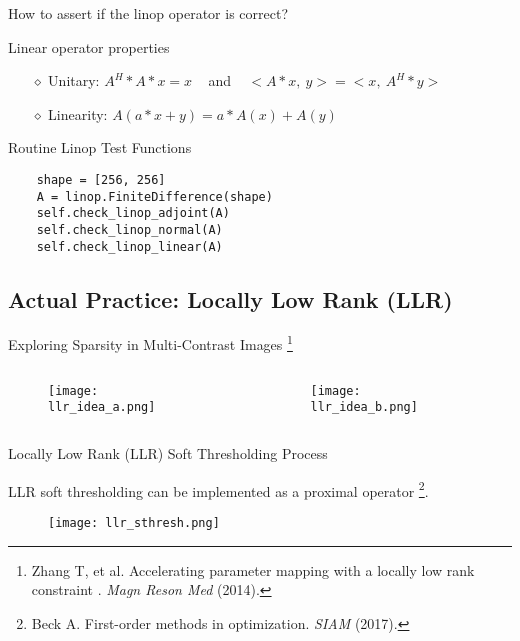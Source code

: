 \begin{frame}[fragile]{How to assert if the linop operator is correct?}

\begin{block}{Linear operator properties}
	{\large
	\begin{itemize}
		\item [$\diamond$] Unitary: $A^H * A * x = x \;\;\;$ and $\;\;\; <A*x,~y> = <x,~A^H*y>$
		\item [$\diamond$] Linearity: $A(a * x + y) = a * A(x) + A(y)$
	\end{itemize}}
\end{block}

\begin{block}{Routine Linop Test Functions}
\begin{lstlisting}
    shape = [256, 256]
    A = linop.FiniteDifference(shape)
    self.check_linop_adjoint(A)
    self.check_linop_normal(A)
    self.check_linop_linear(A)
\end{lstlisting}
\end{block}

\end{frame}

\subsection{Actual Practice: Locally Low Rank (LLR)}

\begin{frame}{Exploring Sparsity in Multi-Contrast Images 
	\footnote{Zhang T, et al. Accelerating parameter mapping with a locally low rank constraint
. \textit{Magn Reson Med} (2014).}}
	\begin{columns}
		\begin{column}{0.5\textwidth}
			\begin{figure}
				\texttt{[image: llr\_idea\_a.png]}
			\end{figure}
		\end{column}
		\begin{column}{0.5\textwidth}
			\begin{figure}
				\texttt{[image: llr\_idea\_b.png]}
			\end{figure}
		\end{column}
	\end{columns}
\end{frame}

\begin{frame}{Locally Low Rank (LLR) Soft Thresholding Process}
	\begin{block}{LLR soft thresholding can be implemented as a proximal operator 
			\footnote{Beck A. First-order methods in optimization. \textit{SIAM} (2017).}.}
		\begin{figure}
			\texttt{[image: llr\_sthresh.png]}
		\end{figure}
	\end{block}
\end{frame}


